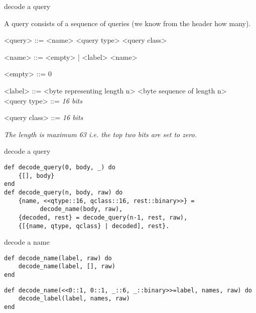 \begin{frame}{decode a query}

A query consists of a sequence of queries (we know from the header how many).

\begin{grammar}
<query> ::= <name> <query type> <query class>

<name> ::= <empty> | <label> <name>

<empty> ::=  0 

<label> ::=  <byte representing length n> <byte sequence of length n> \\

<query type> ::= {\em 16 bits}

<query class> ::= {\em 16 bits}

\end{grammar}

{\em The length is maximum 63 i.e. the top two bits are set to zero.}

\end{frame}

\begin{frame}[fragile]{decode a query}

\begin{verbatim}
def decode_query(0, body, _) do
    {[], body}
end
def decode_query(n, body, raw) do
    {name, <<qtype::16, qclass::16, rest::binary>>} = 
          decode_name(body, raw),
    {decoded, rest} = decode_query(n-1, rest, raw),
    {[{name, qtype, qclass} | decoded], rest}.
\end{verbatim}

\end{frame}


\begin{frame}[fragile]{decode a name}

\begin{verbatim}
def decode_name(label, raw) do
    decode_name(label, [], raw)
end
\end{verbatim}
\vspace{20pt}\pause

\begin{verbatim}
def decode_name(<<0::1, 0::1, _::6, _::binary>>=label, names, raw) do
    decode_label(label, names, raw)
end
\end{verbatim}
\end{frame}


